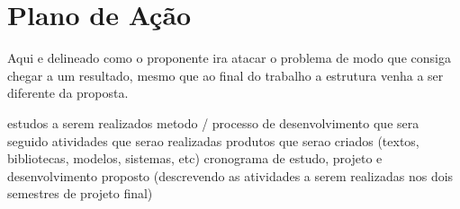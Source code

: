 
\chapter{Plano de A\c{c}\~ao}

Aqui e delineado como o proponente ira atacar o problema de modo que consiga chegar a um resultado, mesmo que ao final do trabalho a estrutura venha a ser diferente da proposta.

estudos a serem realizados
metodo / processo de desenvolvimento que sera seguido
atividades que serao realizadas
produtos que serao criados (textos, bibliotecas, modelos, sistemas, etc)
cronograma de estudo, projeto e desenvolvimento proposto (descrevendo as atividades a serem realizadas nos dois semestres de projeto final)